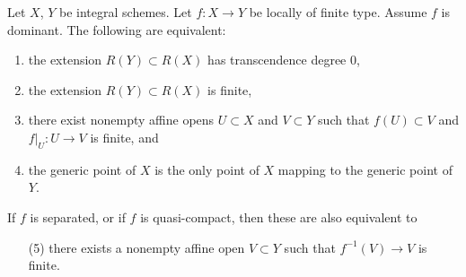 \begin{lemma}
\label{lemma-finite-degree}
Let $X$, $Y$ be integral schemes.
Let $f : X \to Y$ be locally of finite type.
Assume $f$ is dominant.
The following are equivalent:
\begin{enumerate}
\item the extension $R(Y) \subset R(X)$ has
transcendence degree $0$,
\item the extension $R(Y) \subset R(X)$ is finite,
\item there exist nonempty affine opens $U \subset X$
and $V \subset Y$ such that $f(U) \subset V$
and $f|_U : U \to V$ is finite, and
\item the generic point of $X$ is the only point of $X$ mapping to
the generic point of $Y$.
\end{enumerate}
If $f$ is separated, or if $f$ is quasi-compact, then these are
also equivalent to
\begin{enumerate}
\item[(5)] there exists a nonempty affine open $V \subset Y$ such
that $f^{-1}(V) \to V$ is finite.
\end{enumerate}
\end{lemma}

